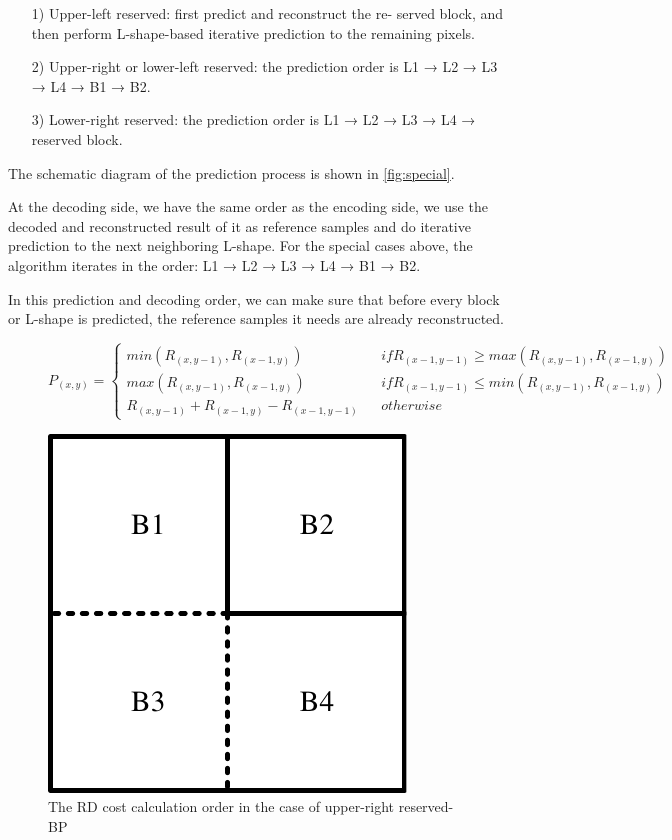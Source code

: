 \documentclass[journal]{IEEEtran}
\begin{document}
\begin{itemize}
    \item [1)]
          Upper-left reserved: first predict and reconstruct the re- served block, and then perform L-shape-based iterative prediction to the remaining pixels.
    \item [2)]
          Upper-right or lower-left reserved: the prediction order is L1 → L2 → L3 → L4 → B1 → B2.
    \item [3)]
          Lower-right reserved: the prediction order is L1 → L2 → L3 → L4 → reserved block.
\end{itemize}
The schematic diagram of the prediction process is shown in \autoref{fig:special}.

At the decoding side, we have the same order as the encoding side, we use the decoded and reconstructed result of it as reference samples and do iterative prediction to the next neighboring L-shape. For the special cases above, the algorithm iterates in the order: L1 → L2 → L3 → L4 → B1 → B2.

In this prediction and decoding order, we can make sure that before every block or L-shape is predicted, the reference samples it needs are already reconstructed.

\begin{figure}[tp]
    \begin{equation}
        P_{(x,y)}=\left\{
        \begin{aligned}
            min(R_{(x,y-1)},R_{(x-1,y)})          &  & if R_{(x-1,y-1)} \geq max(R_{(x,y-1)},R_{(x-1,y)}) \\
            max(R_{(x,y-1)},R_{(x-1,y)})          &  & if R_{(x-1,y-1)} \leq min(R_{(x,y-1)},R_{(x-1,y)}) \\
            R_{(x,y-1)}+R_{(x-1,y)}-R_{(x-1,y-1)} &  & otherwise
        \end{aligned}
        \right.
        \label{planar}
    \end{equation}
\end{figure}

\begin{figure}[tp]
    \centering
    \includegraphics[width=4 cm]{pictures/optimization.pdf}
    \caption{The RD cost calculation order in the case of upper-right reserved-BP}
    \label{fig:optimization}
\end{figure}
\end{document}
